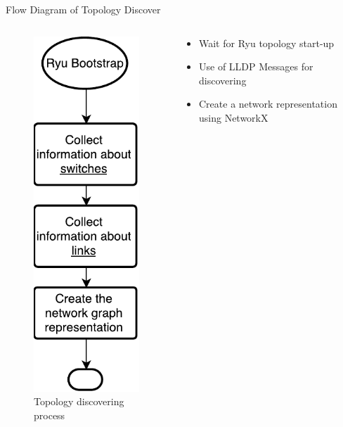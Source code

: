 \documentclass{beamer}
\begin{document}
\begin{frame}{Flow Diagram of Topology Discover}
  \begin{columns}
    \begin{column}{0.5\textwidth}
      \begin{figure}
	    \includegraphics[scale=0.45]{images/algorithm0.pdf}
	    \caption{Topology discovering process}
	  \end{figure}
    \end{column}
    \begin{column}{0.5\textwidth}
      \begin{itemize}
      \item Wait for Ryu topology start-up
      \item Use of LLDP Messages for discovering
      \item Create a network representation using NetworkX
      \end{itemize}
    \end{column}
  \end{columns}
\end{frame}
\end{document}
